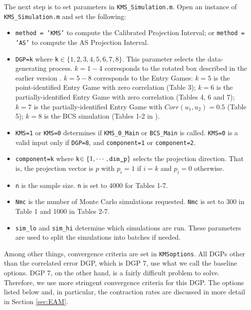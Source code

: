 \documentclass[12pt]{article}
\def\code#1{\texttt{#1}}
\begin{document}
The next step is to set parameters in \code{KMS\_Simulation.m}.  Open an instance of \code{KMS\_Simul\-ation.m} and set the following:
\begin{itemize}
\item \code{method = 'KMS'} to compute the Calibrated Projection Interval; or \code{method = 'AS'} to compute the AS Projection Interval.
\item \code{DGP=k} where \code{k}$\in \{1,2,3,4,5,6,7,8\}$. This parameter selects the data-generating process.  $k=1-4$ corresponds to the rotated box described in the earlier version . $k=5-8$ corresponds to the Entry Games: $k=5$ is the point-identified Entry Game with zero correlation (Table 3); $k=6$ is the partially-identified Entry Game with zero correlation (Tables 4, 6 and 7); $k=7$ is the partially-identified Entry Game with $Corr(u_1,u_2) = 0.5$ (Table 5);     $k=8$ is the BCS simulation (Tables 1-2 in ).
\item \code{KMS=1} or \code{KMS=0} determines if \code{KMS\_0\_Main} or \code{BCS\_Main} is called. \code{KMS=0} is a valid input only if \code{DGP=8}, and  \code{component=1} or \code{component=2}.
\item \code{component=k} where \code{k}$\in \{1,\cdots,\text{\code{dim\_p}}\}$ selects the projection direction.  That is, the projection vector is $p$ with $p_i = 1$ if $i=k$ and $p_i = 0$ otherwise.
\item \code{n} is the sample size.  \code{n} is set to $4000$ for Tables 1-7.
\item \code{Nmc} is the number of Monte Carlo simulations requested.  \code{Nmc} is set to 300 in Table 1 and 1000 in Tables 2-7.
\item \code{sim\_lo} and \code{sim\_hi} determine which simulations are run.  These parameters are used to split the simulations into batches if needed.
\end{itemize}
Among other things, convergence criteria  are set in \code{KMSoptions}.  All DGPs other than the correlated error DGP, which is DGP 7, use what we call the baseline options.  DGP 7, on the other hand, is a fairly difficult problem to solve.  Therefore, we use more stringent convergence criteria for this DGP.  The options listed below and, in particular, the contraction rates are discussed in more detail in Section \ref{sec:EAM}.
\end{document}
